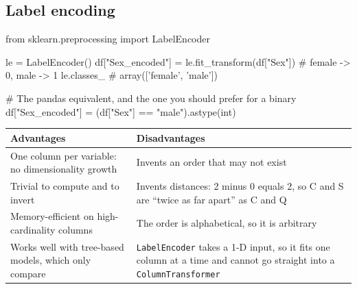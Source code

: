 \documentclass[11pt,a4paper]{article}
\begin{document}

\subsection{Label encoding}


\begin{py}
from sklearn.preprocessing import LabelEncoder

le = LabelEncoder()
df["Sex_encoded"] = le.fit_transform(df["Sex"])    # female -> 0, male -> 1
le.classes_                                        # array(['female', 'male'])

# The pandas equivalent, and the one you should prefer for a binary
df["Sex_encoded"] = (df["Sex"] == "male").astype(int)
\end{py}

\begin{tabularx}{\textwidth}{@{}X X@{}}
\toprule
\rowcolor{tablehead} \textbf{Advantages} & \textbf{Disadvantages} \\
\midrule
One column per variable: no dimensionality growth & Invents an order that may not exist \\
Trivial to compute and to invert & Invents distances: 2 minus 0 equals 2, so C and S are ``twice as far apart'' as C and Q \\
Memory-efficient on high-cardinality columns & The order is alphabetical, so it is arbitrary \\
Works well with tree-based models, which only compare & \lstinline|LabelEncoder| takes a 1-D input, so it fits one column at a time and cannot go straight into a \lstinline|ColumnTransformer| \\
\bottomrule
\end{tabularx}


\end{document}
